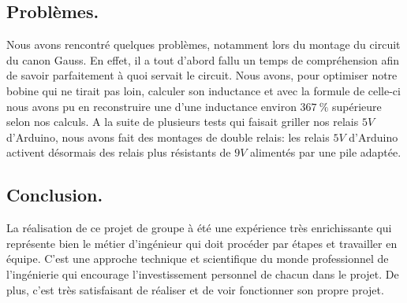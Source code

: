 \subsection{Problèmes.}
Nous avons rencontré quelques problèmes, notamment lors du montage du circuit du canon Gauss. En effet, il a tout d'abord fallu un temps de compréhension afin de savoir parfaitement à quoi servait le circuit. Nous avons, pour optimiser notre bobine qui ne tirait pas loin, calculer son inductance et avec la formule de celle-ci nous avons pu en reconstruire une d'une inductance environ $367\ \%$ supérieure selon nos calculs. A la suite de plusieurs tests qui faisait griller nos relais $5V$ d'Arduino, nous avons fait des montages de double relais: les relais $5V$ d'Arduino activent désormais des relais plus résistants de $9V$ alimentés par une pile adaptée.

\subsection{Conclusion.}
La réalisation de ce projet de groupe à été une expérience très enrichissante qui représente bien le métier d'ingénieur qui doit procéder par étapes et travailler en équipe. C'est une approche technique et scientifique du monde professionnel de l'ingénierie qui encourage l'investissement personnel de chacun dans le projet. De plus, c'est très satisfaisant de réaliser et de voir fonctionner son propre projet.

